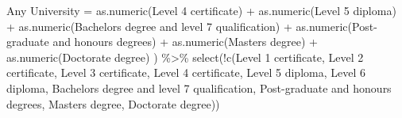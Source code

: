 \documentclass[
  letterpaper,
  DIV=11,
  numbers=noendperiod,
  oneside]{scrartcl}
\newenvironment{Shaded}{\begin{snugshade}}{\end{snugshade}}
\newcommand{\AttributeTok}[1]{\textcolor[rgb]{0.40,0.45,0.13}{#1}}
\newcommand{\FunctionTok}[1]{\textcolor[rgb]{0.28,0.35,0.67}{#1}}
\newcommand{\NormalTok}[1]{\textcolor[rgb]{0.00,0.23,0.31}{#1}}
\newcommand{\OtherTok}[1]{\textcolor[rgb]{0.00,0.23,0.31}{#1}}
\newcommand{\SpecialCharTok}[1]{\textcolor[rgb]{0.37,0.37,0.37}{#1}}
\newcommand{\StringTok}[1]{\textcolor[rgb]{0.13,0.47,0.30}{#1}}
\begin{document}
\begin{Shaded}
\begin{Highlighting}[]
    \StringTok{\textasciigrave{}}\AttributeTok{Any University}\StringTok{\textasciigrave{}} \OtherTok{=} \FunctionTok{as.numeric}\NormalTok{(}\StringTok{\textasciigrave{}}\AttributeTok{Level 4 certificate}\StringTok{\textasciigrave{}}\NormalTok{) }\SpecialCharTok{+} \FunctionTok{as.numeric}\NormalTok{(}\StringTok{\textasciigrave{}}\AttributeTok{Level 5 diploma}\StringTok{\textasciigrave{}}\NormalTok{) }\SpecialCharTok{+} \FunctionTok{as.numeric}\NormalTok{(}\StringTok{\textasciigrave{}}\AttributeTok{Bachelor\textquotesingle{}s degree and level 7 qualification}\StringTok{\textasciigrave{}}\NormalTok{) }\SpecialCharTok{+} \FunctionTok{as.numeric}\NormalTok{(}\StringTok{\textasciigrave{}}\AttributeTok{Post{-}graduate and honours degrees}\StringTok{\textasciigrave{}}\NormalTok{) }\SpecialCharTok{+} \FunctionTok{as.numeric}\NormalTok{(}\StringTok{\textasciigrave{}}\AttributeTok{Master\textquotesingle{}s degree}\StringTok{\textasciigrave{}}\NormalTok{) }\SpecialCharTok{+} \FunctionTok{as.numeric}\NormalTok{(}\StringTok{\textasciigrave{}}\AttributeTok{Doctorate degree}\StringTok{\textasciigrave{}}\NormalTok{)}
\NormalTok{    ) }\SpecialCharTok{\%\textgreater{}\%}
  \FunctionTok{select}\NormalTok{(}\SpecialCharTok{!}\FunctionTok{c}\NormalTok{(}\StringTok{\textasciigrave{}}\AttributeTok{Level 1 certificate}\StringTok{\textasciigrave{}}\NormalTok{, }\StringTok{\textasciigrave{}}\AttributeTok{Level 2 certificate}\StringTok{\textasciigrave{}}\NormalTok{, }\StringTok{\textasciigrave{}}\AttributeTok{Level 3 certificate}\StringTok{\textasciigrave{}}\NormalTok{,}
            \StringTok{\textasciigrave{}}\AttributeTok{Level 4 certificate}\StringTok{\textasciigrave{}}\NormalTok{, }\StringTok{\textasciigrave{}}\AttributeTok{Level 5 diploma}\StringTok{\textasciigrave{}}\NormalTok{, }\StringTok{\textasciigrave{}}\AttributeTok{Level 6 diploma}\StringTok{\textasciigrave{}}\NormalTok{,}
            \StringTok{\textasciigrave{}}\AttributeTok{Bachelor\textquotesingle{}s degree and level 7 qualification}\StringTok{\textasciigrave{}}\NormalTok{, }\StringTok{\textasciigrave{}}\AttributeTok{Post{-}graduate and honours degrees}\StringTok{\textasciigrave{}}\NormalTok{,}
            \StringTok{\textasciigrave{}}\AttributeTok{Master\textquotesingle{}s degree}\StringTok{\textasciigrave{}}\NormalTok{, }\StringTok{\textasciigrave{}}\AttributeTok{Doctorate degree}\StringTok{\textasciigrave{}}\NormalTok{))}
\end{Highlighting}
\end{Shaded}

\end{document}
